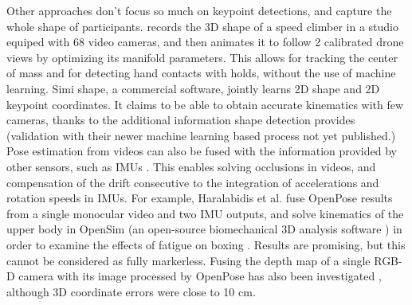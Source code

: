 Other approaches don't focus so much on keypoint detections, and capture the whole shape of participants. \cite{Reveret2020} records the 3D shape of a speed climber in a studio equiped with 68 video cameras, and then animates it to follow 2 calibrated drone views by optimizing its manifold parameters. This allows for tracking the center of mass and for detecting hand contacts with holds, without the use of machine learning. Simi shape, a commercial software, jointly learns 2D shape and 2D keypoint coordinates. It claims to be able to obtain accurate kinematics with few cameras, thanks to the additional information shape detection provides (validation with their newer machine learning based process not yet published.) Pose estimation from videos can also be fused with the information provided by other sensors, such as IMUs \cite{Bao2022, Zhang2020}. This enables solving occlusions in videos, and compensation of the drift consecutive to the integration of accelerations and rotation speeds in IMUs. For example, Haralabidis et al. fuse OpenPose results from a single monocular video and two IMU outputs, and solve kinematics of the upper body in OpenSim (an open-source biomechanical 3D analysis software \cite{Delp2007,Seth2018}) in order to examine the effects of fatigue on boxing \cite{Haralabidis2020}. Results are promising, but this cannot be considered as fully markerless. Fusing the depth map of a single RGB-D camera with its image processed by OpenPose has also been investigated \cite{Liu2022c}, although 3D coordinate errors were close to 10 cm.


